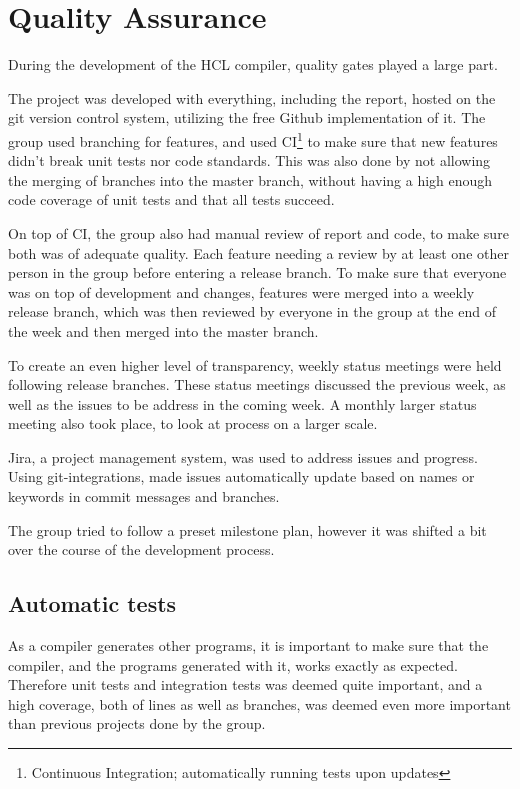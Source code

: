 \section{Quality Assurance}
During the development of the HCL compiler, quality gates played a large part.

The project was developed with everything, including the report, hosted on the git\cite{GitProtocol} version control system, utilizing the free Github implementation of it.
The group used branching for features, and used CI\footnote{Continuous Integration; automatically running tests upon updates} to make sure that new features didn't break unit tests nor code standards. This was also done by not allowing the merging of branches into the master branch, without having a high enough code coverage of unit tests and that all tests succeed.

On top of CI, the group also had manual review of report and code, to make sure both was of adequate quality. 
Each feature needing a review by at least one other person in the group before entering a release branch.
To make sure that everyone was on top of development and changes, features were merged into a weekly release branch, which was then reviewed by everyone in the group at the end of the week and then merged into the master branch.

To create an even higher level of transparency, weekly status meetings were held following release branches.
These status meetings discussed the previous week, as well as the issues to be address in the coming week. 
A monthly larger status meeting also took place, to look at process on a larger scale. 

Jira\cite{Jira}, a project management system, was used to address issues and progress.
Using git-integrations, made issues automatically update based on names or keywords in commit messages and branches.

The group tried to follow a preset milestone plan, however it was shifted a bit over the course of the development process.

\subsection{Automatic tests}

As a compiler generates other programs, it is important to make sure that the compiler, and the programs generated with it, works exactly as expected.
Therefore unit tests and integration tests was deemed quite important, and a high coverage, both of lines as well as branches, was deemed even more important than previous projects done by the group. 

